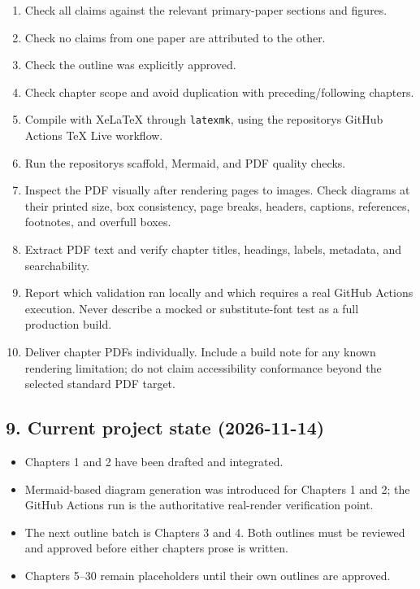 \begin{enumerate}
\def\labelenumi{\arabic{enumi}.}
\tightlist
\item
  Check all claims against the relevant primary-paper sections and
  figures.
\item
  Check no claims from one paper are attributed to the other.
\item
  Check the outline was explicitly approved.
\item
  Check chapter scope and avoid duplication with preceding/following
  chapters.
\item
  Compile with XeLaTeX through \texttt{latexmk}, using the
  repository\textquotesingle s GitHub Actions TeX Live workflow.
\item
  Run the repository\textquotesingle s scaffold, Mermaid, and PDF
  quality checks.
\item
  Inspect the PDF visually after rendering pages to images. Check
  diagrams at their printed size, box consistency, page breaks, headers,
  captions, references, footnotes, and overfull boxes.
\item
  Extract PDF text and verify chapter titles, headings, labels,
  metadata, and searchability.
\item
  Report which validation ran locally and which requires a real GitHub
  Actions execution. Never describe a mocked or substitute-font test as
  a full production build.
\item
  Deliver chapter PDFs individually. Include a build note for any known
  rendering limitation; do not claim accessibility conformance beyond
  the selected standard PDF target.
\end{enumerate}

\subsection{9. Current project state
(2026-11-14)}\label{9-current-project-state-2026-11-14}

\begin{itemize}
\tightlist
\item
  Chapters 1 and 2 have been drafted and integrated.
\item
  Mermaid-based diagram generation was introduced for Chapters 1 and 2;
  the GitHub Actions run is the authoritative real-render verification
  point.
\item
  The next outline batch is Chapters 3 and 4. Both outlines must be
  reviewed and approved before either chapter\textquotesingle s prose is
  written.
\item
  Chapters 5--30 remain placeholders until their own outlines are
  approved.
\end{itemize}

